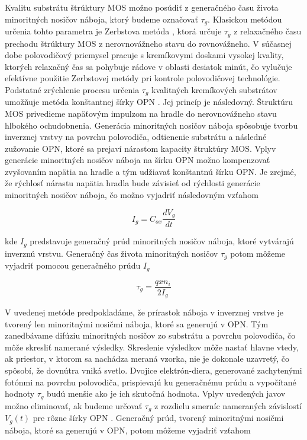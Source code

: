 Kvalitu substrátu štrúktury MOS možno posúdiť z generačného času
života minoritných nosičov náboja, ktorý budeme označovať
$\tau_g$. Klasickou metódou určenia tohto parametra je Zerbstova metóda
\cite{3.2}, ktorá určuje $\tau_g$ z relaxačného času prechodu štrúktury MOS
z nerovnovážneho stavu do rovnovážneho. V súčasnej dobe polovodičový
priemysel pracuje s kremíkovymi doskami vysokej kvality, ktorých
relaxačný čas sa pohybuje rádove v oblasti desiatok minút, čo vylučuje
efektívne použitie Zerbstovej metódy pri kontrole polovodičovej
technológie. Podstatné zrýchlenie procesu určenia $\tau_g$ kvalitných
kremíkových substrátov umožňuje metóda konštantnej šírky OPN
\cite{3.1}. Jej princíp je následovný.  Štruktúru MOS privedieme
napäťovým impulzom na hradle do nerovnovážneho stavu hlbokého
ochudobnenia. Generácia minoritných nosičov náboja spôsobuje tvorbu
inverznej vrstvy na povrchu polovodiča, odtienenie substrátu a
následné zužovanie OPN, ktoré sa prejaví nárastom kapacity štruktúry
MOS. Vplyv generácie minoritných nosičov náboja na šírku OPN možno
kompenzovať zvyšovaním napätia na hradle a tým udžiavať konštantnú
šírku OPN. Je zrejmé, že rýchlosť nárastu napätia hradla bude závisieť
od rýchlosti generácie minoritných nosičov náboja, čo možno vyjadriť
následovným vzťahom \cite{3.3}

\begin{equation}\label{eq:3.4}
I_g = C_{ox} \frac{dV_g}{dt}
\end{equation}

kde $I_g$ predstavuje generačný prúd minoritných nosičov náboja, ktoré
vytvárajú inverznú vrstvu.  Generačný čas života minoritných nosičov
$\tau_g$ potom môžeme vyjadriť pomocou generačného prúdu $I_g$ \cite{3.3}

\begin{equation}\label{eq:3.5}
\tau_g = \frac{qxn_i}{2I_g}
\end{equation}

V uvedenej metóde predpokladáme, že prírastok náboja v inverznej
vrstve je tvorený len minoritnými nosičmi náboja, ktoré sa generujú v
OPN. Tým zanedbávame difúziu minoritných nosičov zo substrátu a
povrchu polovodiča, čo môže skresliť namerané výsledky. Skreslenie
výsledkov môže nastať hlavne vtedy, ak priestor, v ktorom sa nachádza
meraná vzorka, nie je dokonale uzavretý, čo spôsobí, že dovnútra vniká
svetlo.  Dvojice elektrón-diera, generované zachytenými fotónmi na
povrchu polovodiča, prispievajú ku generačnému prúdu a vypočítané
hodnoty $\tau_g$ budú menšie ako je ich skutočná hodnota.  Vplyv
uvedených javov možno eliminovať, ak budeme určovať $\tau_g$ z
rozdielu smerníc nameraných závislostí $V_g(t)$ pre rôzne šírky OPN
\cite{3.3, 3.10, 3.11, 3.12}. Generačný prúd, tvorený minoritnými
nosičmi náboja, ktoré sa generujú v OPN, potom môžeme vyjadriť vzťahom

